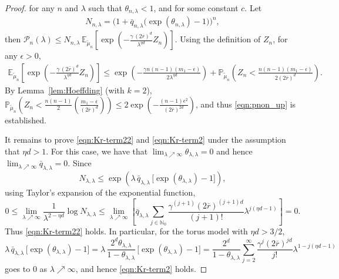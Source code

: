 \documentclass[11pt]{article}
\newcommand{\pp}{\mathbb{P}}
\newcommand{\ee}{\mathbb{E}}
\newcommand{\rbdd}{\overline{r}}
\newcommand{\mbb}{\mathbb}
\newcommand{\lt}{\left}
\newcommand{\rt}{\right}
\newcommand{\wt}{\widetilde}
\newcommand{\pnon}{\mathcal{P}_n(\lambda)}
\begin{document}
\begin{appendices}
\begin{proof}
for any $n$ and $\lambda$ such that $\theta_{n,\lambda} < 1$, and for some constant $c$. Let 
\begin{align}
N_{n, \lambda} = \Big( 1 + \bar q_{n,\lambda} \Big(\exp\lt(\theta_{n, \lambda}\rt) - 1\Big) \Big)^n,
\label{eqn:Nnlam}
\end{align}
 then $\pnon  \leq N_{n,\lambda}\, \ee_{\wt \mu_n}\left[  \exp\left( - \frac{\gamma\,(2\rbdd)^d}{\lambda^{\eta d}}Z_n \right)\right].$
Using the definition of $Z_n$, for any $\epsilon > 0$,
\small{
\begin{align*}
\ee_{\wt \mu_n}\left[  \exp\left( - \frac{\gamma\, (2\rbdd)^d}{\lambda^{\eta d}}Z_n\right)\right] \leq \exp\left( - \frac{\gamma n(n-1)(m_1 - \epsilon)}{2\lambda^{\eta d}} \right) + \pp_{\wt \mu_n}\left(Z_n < \frac{n(n-1)(m_1 - \epsilon)}{2(2\rbdd)^d} \right).
\end{align*}}
By Lemma~\ref{lem:Hoeffding} (with $k = 2$), $\pp_{\wt \mu_n}\left(Z_n < \frac{n(n-1)}{2} \lt(\frac{m_1 - \epsilon}{(2\rbdd)^d}\rt)\right) \leq 2\exp\left( - \frac{(n-1)\epsilon^2}{(2\rbdd)^{2d}}\right)$,
 and thus \eqref{eqn:pnon_up} is established.
 
It remains to prove \eqref{eqn:Kr-term22} and \eqref{eqn:Kr-term2} under the assumption that $\eta d > 1$. For this case, we have that $\lim_{\lambda \nearrow \infty}\theta_{\lambda, \lambda} = 0$ and hence $\lim_{\lambda \nearrow \infty}\bar q_{\lambda, \lambda} = 0$. 
Since $$N_{\lambda, \lambda}  \leq \exp\lt( \lambda\, \bar q_{\lambda, \lambda}\, \Big[\exp\lt(\theta_{\lambda, \lambda} \rt) - 1\Big] \rt),$$
using Taylor's expansion {of the} exponential function,
\[
0 \leq \lim_{\lambda \nearrow \infty}\frac{1}{\lambda^{2 - \eta d}} \log N_{\lambda, \lambda} \leq \lim_{\lambda \nearrow \infty }\lt[\bar q_{\lambda, \lambda} \sum_{j\in \mbb{N}_0} \frac{\gamma^{(j+1)} (2\rbdd)^{(j+1)d}}{(j+1)!} \lambda^{j(\eta d - 1)}\rt] = 0.
\]
Thus \eqref{eqn:Kr-term22} holds. In particular, for the torus  model with $\eta d > 3/2$,
\[
\lambda \, \bar q_{\lambda, \lambda}\, \Big[\exp\lt(\theta_{\lambda, \lambda} \rt) - 1\Big] = \lambda \, \frac{2^d  \theta_{\lambda, \lambda}}{1 - \theta_{\lambda, \lambda} }\, \Big[\exp\lt(\theta_{\lambda, \lambda} \rt) - 1\Big] = \frac{2^d}{1 - \theta_{\lambda, \lambda}}\sum_{j= 2}^\infty \frac{\gamma^j (2\rbdd)^{jd}}{j!} \lambda^{1 - j(\eta d - 1)}
\]
goes to $0$ as $\lambda \nearrow \infty$, and hence \eqref{eqn:Kr-term2} holds.
\end{proof}






\end{appendices}
\end{document}
